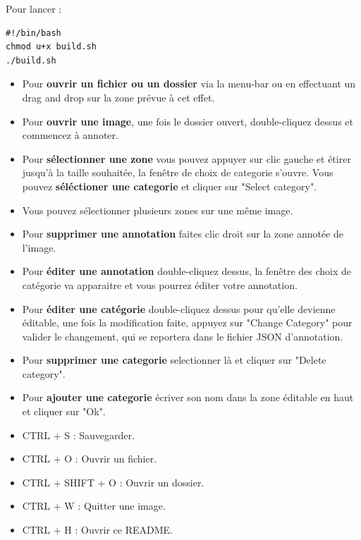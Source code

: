 Pour lancer :
\begin{verbatim}
#!/bin/bash
chmod u+x build.sh
./build.sh
\end{verbatim}
\clearpage

\begin{itemize}
    \item Pour \textbf{ouvrir un fichier ou un dossier} via la menu-bar ou en effectuant un drag and drop sur la zone prévue à cet effet.
    \item Pour \textbf{ouvrir une image}, une fois le dossier ouvert, double-cliquez dessus et commencez à annoter.
    \item Pour \textbf{sélectionner une zone} vous pouvez appuyer sur clic gauche et étirer jusqu'à la taille souhaitée, la fenêtre de choix de categorie s'ouvre. Vous pouvez \textbf{séléctioner une categorie} et cliquer sur "Select category".
    \item Vous pouvez sélectionner plusieurs zones sur une même image.
    \item Pour \textbf{supprimer une annotation} faites clic droit sur la zone annotée de l'image.
    \item Pour \textbf{éditer une annotation} double-cliquez dessus, la fenêtre des choix de catégorie va apparaitre et vous pourrez éditer votre annotation.
    \item Pour \textbf{éditer une catégorie} double-cliquez dessus pour qu'elle devienne éditable, une fois la modification faite, appuyez sur "Change Category" pour valider le changement, qui se reportera dans le fichier JSON d'annotation.
    \item Pour \textbf{supprimer une categorie} selectionner là et cliquer sur "Delete category".
    \item Pour \textbf{ajouter  une categorie} écriver son nom dans la zone éditable en haut et cliquer sur "Ok".
    \item CTRL + S : Sauvegarder.
    \item CTRL + O : Ouvrir un fichier.
    \item CTRL + SHIFT + O : Ouvrir un dossier.
    \item CTRL + W : Quitter une image.
    \item CTRL + H : Ouvrir ce README.
\end{itemize}

